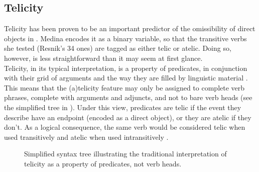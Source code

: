 \subsection{Telicity} Telicity has been proven to be an important predictor of the omissibility of direct objects in . Medina encodes it as a binary variable, so that the transitive verbs she tested (Resnik's 34 ones) are tagged as either telic or atelic. Doing so, however, is less straightforward than it may seem at first glance.\\
Telicity, in its typical interpretation, is a property of predicates, in conjunction with their grid of arguments and the way they are filled by linguistic material \parencite{Vendler1957, dowty2012word1979}. This means that the (a)telicity feature may only be assigned to complete verb phrases, complete with arguments and adjuncts, and not to bare verb heads (see the simplified tree in ). Under this view, predicates are telic if the event they describe have an endpoint (encoded as a direct object), or they are atelic if they don't. As a logical consequence, the same verb would be considered telic when used transitively and atelic when used intransitively \parencite{OlsenResnik1997, Mittwoch1982}.

\begin{figure}[htb]
\caption{Simplified syntax tree illustrating the traditional interpretation of telicity as a property of predicates, not verb heads.}
\end{figure}

